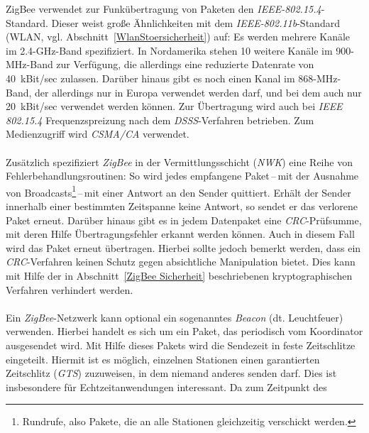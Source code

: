                 ZigBee verwendet zur Funkübertragung von Paketen den \emph{IEEE-802.15.4}-Standard.
                Dieser weist große Ähnlichkeiten mit dem \emph{IEEE-802.11b}-Standard (WLAN, vgl. 
                Abschnitt~\ref{WlanStoersicherheit}) auf: Es werden mehrere Kanäle im
                2.4-GHz-Band spezifiziert. In Nordamerika stehen 10 weitere Kanäle im 900-MHz-Band
                zur Verfügung, die allerdings eine reduzierte Datenrate von 40~kBit/sec zulassen. 
                Darüber hinaus gibt es noch einen Kanal im 868-MHz-Band, der allerdings nur in Europa
                verwendet werden darf, und bei dem auch nur 20~kBit/sec verwendet werden können. Zur Übertragung wird auch bei 
                \emph{IEEE 802.15.4} Frequenzspreizung nach dem \emph{DSSS}-Verfahren betrieben. Zum Medienzugriff
                wird \emph{CSMA/CA} verwendet.\\
                \\
                Zusätzlich spezifiziert \emph{ZigBee} in der Vermittlungsschicht (\emph{NWK}) eine Reihe von Fehlerbehandlungsroutinen:
                So wird jedes empfangene Paket\,--\,mit der Ausnahme von Broadcasts\footnote{Rundrufe, also
                Pakete, die an alle Stationen gleichzeitig verschickt werden.}\,--\,mit einer Antwort
                an den Sender quittiert. Erhält der Sender innerhalb einer bestimmten Zeitspanne
                keine Antwort, so sendet er das verlorene Paket erneut. Darüber hinaus gibt es in jedem
                Datenpaket eine \emph{CRC}-Prüfsumme, mit deren Hilfe Übertragungsfehler erkannt werden können.
                Auch in diesem Fall wird das Paket erneut übertragen. Hierbei sollte jedoch bemerkt werden,
                dass ein \emph{CRC}-Verfahren keinen Schutz gegen absichtliche Manipulation bietet. Dies kann
                mit Hilfe der in Abschnitt~\ref{ZigBee Sicherheit} beschriebenen kryptographischen Verfahren
                verhindert werden.\\
                \\
                Ein \emph{ZigBee}-Netzwerk kann optional ein sogenanntes \emph{Beacon} (dt. Leuchtfeuer) verwenden. Hierbei
                handelt es sich um ein Paket, das periodisch vom Koordinator ausgesendet wird. Mit Hilfe
                dieses Pakets wird die Sendezeit in feste Zeitschlitze eingeteilt. Hiermit ist es möglich, 
                einzelnen Stationen einen garantierten Zeitschlitz (\emph{GTS}) zuzuweisen, in dem niemand anderes
                senden darf. Dies ist insbesondere für Echtzeitanwendungen interessant. Da zum Zeitpunkt des
